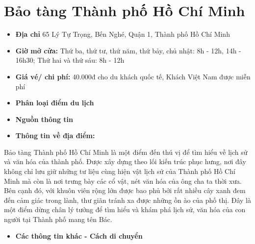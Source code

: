 \documentclass{article}
\begin{document}
\section{Bảo tàng Thành phố Hồ Chí Minh}
\begin{itemize}
    \item{\textbf{Địa chỉ}} 65 Lý Tự Trọng, Bến Nghé, Quận 1, Thành phố Hồ Chí Minh
    \item{\textbf{Giờ mở cửa:}} Thứ ba, thứ tư, thứ năm, thứ bảy, chủ nhật: 8h - 12h, 14h - 16h30; Thứ hai và thứ sáu: 8h - 12h
    \item{\textbf{Giá vé/ chi phí:}} 40.000đ cho du khách quốc tế, Khách Việt Nam được miễn phí
    \item{\textbf{Phân loại điểm du lịch} }
    \item{\textbf{Nguồn thông tin}}
    \item{\textbf{Thông tin về địa điểm:}}
\end{itemize}
Bảo tàng Thành phố Hồ Chí Minh là một điểm đến thú vị để tìm hiểu về lịch sử và văn hóa của thành phố. Được xây dựng theo lối kiến trúc phục hưng, nơi đây không chỉ lưu giữ những tư liệu cùng hiện vật lịch sử của Thành phố Hồ Chí Minh mà còn là nơi trưng bày các cổ vật, nét văn hóa của ông cha ta thời xưa. Bên cạnh đó, với khuôn viên rộng lớn được bao phủ bởi rất nhiều cây xanh đem đến cảm giác trong lành, thư giãn tránh xa được những ồn ào của phố thị. Đây là một điểm dừng chân lý tưởng để tìm hiểu và khám phá lịch sử, văn hóa của con người tại Thành phố mang tên Bác.
\begin{itemize}
    \item{\textbf{Các thông tin khác - Cách di chuyển}}
\end{itemize}
\end{document}
